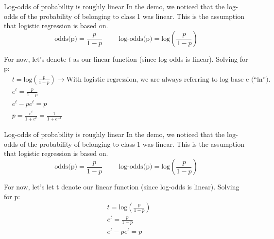 \documentclass[aspectratio=169]{../latex_main/tntbeamer}  %
\begin{document}
	
	\begin{frame}{Log-odds of probability is roughly linear}
	    In the demo, we noticed that the log-odds of the probability of belonging to class 1 was linear. This is the assumption that logistic regression is based on. \\
	    \begin{equation*}
	        \text{odds(p)} = \frac{p}{1 - p}\hspace{1cm} \text{log-odds(p)} = \text{log}\left(\frac{p}{1 - p}\right)
	    \end{equation*}
	    
	    For now, let’s denote $t$ as our linear function (since log-odds is linear). Solving for p:
	    \begin{align*}
	        &t = \text{log}\left(\frac{p}{1 - p}\right)\rightarrow \text{With logistic regression, we are always referring to log base e (“ln”).
} \\
	        &e^t = \frac{p}{1 - p}\\
	        &e^t - pe^t = p\\
	        &p = \frac{e^t}{1 + e^t} = \frac{1}{1 + e^{-t}}
	    \end{align*}
	\end{frame}
	
	\begin{frame}{Log-odds of probability is roughly linear}
	    In the demo, we noticed that the log-odds of the probability of belonging to class 1 was linear. This is the assumption that logistic regression is based on. \\
	    \begin{equation*}
	        \text{odds(p)} = \frac{p}{1 - p}\hspace{1cm} \text{log-odds(p)} = \text{log}\left(\frac{p}{1 - p}\right)
	    \end{equation*}
	    
	    For now, let’s let t denote our linear function (since log-odds is linear). Solving for p:
	    \begin{align*}
	        &t = \text{log}\left(\frac{p}{1 - p}\right)\\
	        &e^t = \frac{p}{1 - p}\\
	        &e^t - pe^t = p\\
	    \end{align*}
	\end{frame}
	
	
	
\end{document}
